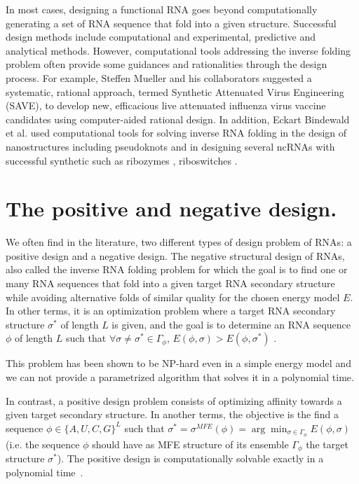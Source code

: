 In most cases, designing a functional RNA goes beyond computationally generating a set of RNA sequence that fold into a given structure. Successful design methods include computational and experimental, predictive and analytical methods. However, computational tools addressing the inverse folding problem often provide some guidances and rationalities through the design process. For example, Steffen Mueller and his collaborators \cite{mueller2010live} suggested a systematic, rational approach, termed Synthetic Attenuated Virus Engineering (SAVE), to develop new, efficacious live attenuated influenza virus vaccine candidates using computer-aided rational design. In addition, Eckart Bindewald et al. \cite{bindewald2011multistrand} used computational tools for solving inverse RNA folding in the design of nanostructures  including pseudoknots and in designing several ncRNAs with successful synthetic such as ribozymes \cite{dotu2014complete}, riboswitches \cite{findeiss2015design,wachsmuth2015design}. 

\section{The positive and negative design.}
We often find in the literature, two different types of design problem of RNAs: a positive design and a negative design. 
The negative structural design of RNAs, also called the inverse RNA folding problem for which the goal is to find one or many RNA sequences that fold into a given target RNA secondary structure while avoiding alternative folds of similar quality for
the chosen energy model $E$. In other terms, it is an optimization problem where a target RNA secondary structure $\sigma^*$ of length $L$ is given, and the goal is to determine an RNA sequence $\phi$ of length $L$ such that $\forall \sigma \neq \sigma^* \in \Gamma_{\phi}$, $E(\phi, \sigma) > E(\phi, \sigma^*)$ .

This problem has been shown to be NP-hard even in a simple energy model \cite{bonnet2020designing} and we can not provide a parametrized algorithm that solves it in a polynomial time. 

In contrast, a positive design problem consists of optimizing affinity towards a given target secondary structure. In another terms, the objective is the find a sequence $\phi \in \{A,U,C,G\}^L$ such that  $ \sigma^*=\sigma^{MFE}(\phi) = \arg \min_{\sigma \in \Gamma_{\phi}} E(\phi, \sigma)$ (i.e. the sequence $\phi$ should have as MFE structure of its ensemble $\Gamma_{\phi}$ the target structure $\sigma^*$). The positive design is computationally solvable exactly in a polynomial time \cite{flamm2001design}. 

